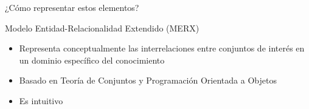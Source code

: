 \begin{frame}{¿C\'omo representar estos elementos?}
    \begin{block}{Modelo Entidad-Relacionalidad Extendido (MERX)}
        \begin{itemize}
            \item<1-> Representa conceptualmente las interrelaciones entre conjuntos de inter\'es en un dominio espec\'ifico del conocimiento
            \item<2-> Basado en Teor\'ia de Conjuntos y Programaci\'on Orientada a Objetos
            \item<3-> Es intuitivo
        \end{itemize}
        
        
    \end{block}
\end{frame}